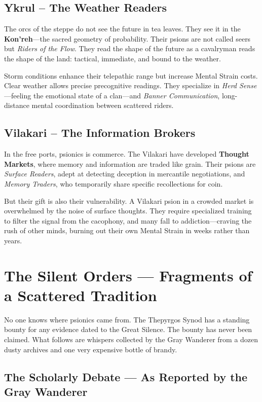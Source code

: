 \documentclass[11pt,twoside]{article}
\begin{document}
\subsection{Ykrul -- The Weather Readers}
The orcs of the steppe do not see the future in tea leaves. They see it in the \textbf{Kon'reh}---the sacred geometry of probability. Their psions are not called seers but \textit{Riders of the Flow}. They read the shape of the future as a cavalryman reads the shape of the land: tactical, immediate, and bound to the weather.

Storm conditions enhance their telepathic range but increase Mental Strain costs. Clear weather allows precise precognitive readings. They specialize in \textit{Herd Sense}---feeling the emotional state of a clan---and \textit{Banner Communication}, long-distance mental coordination between scattered riders.

\subsection{Vilakari -- The Information Brokers}
In the free ports, psionics is commerce. The Vilakari have developed \textbf{Thought Markets}, where memory and information are traded like grain. Their psions are \textit{Surface Readers}, adept at detecting deception in mercantile negotiations, and \textit{Memory Traders}, who temporarily share specific recollections for coin.

But their gift is also their vulnerability. A Vilakari psion in a crowded market is overwhelmed by the noise of surface thoughts. They require specialized training to filter the signal from the cacophony, and many fall to addiction---craving the rush of other minds, burning out their own Mental Strain in weeks rather than years.


\section{The Silent Orders --- Fragments of a Scattered Tradition}

\noindent No one knows where psionics came from. The Thepyrgos Synod has a standing bounty for any evidence dated to the Great Silence. The bounty has never been claimed. What follows are whispers collected by the Gray Wanderer from a dozen dusty archives and one very expensive bottle of brandy.

\subsection*{The Scholarly Debate --- As Reported by the Gray Wanderer}
\end{document}
